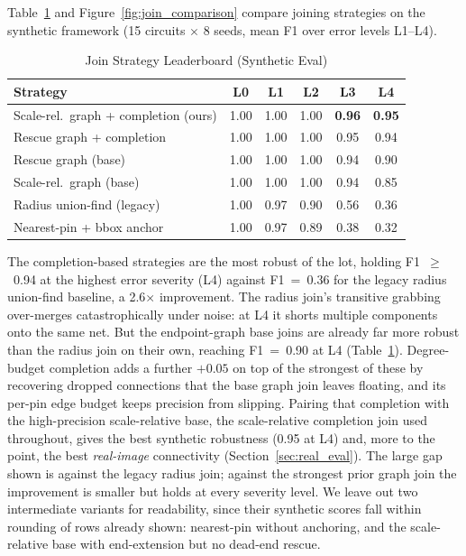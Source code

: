 \documentclass{ieeeaccess}
\begin{document}
Table~\ref{tab:join_leaderboard} and Figure~\ref{fig:join_comparison} compare joining strategies on the synthetic framework (15 circuits $\times$ 8 seeds, mean F1 over error levels L1--L4).

\begin{table}[htbp]
\caption{Join Strategy Leaderboard (Synthetic Eval)}
\label{tab:join_leaderboard}
\begin{center}
\footnotesize
\setlength{\tabcolsep}{4pt}
\begin{tabular}{lccccc}
\toprule
\textbf{Strategy} & \textbf{L0} & \textbf{L1} & \textbf{L2} & \textbf{L3} & \textbf{L4} \\
\midrule
Scale-rel.\ graph + completion (ours) & 1.00 & 1.00 & 1.00 & \textbf{0.96} & \textbf{0.95} \\
Rescue graph + completion & 1.00 & 1.00 & 1.00 & 0.95 & 0.94 \\
Rescue graph (base) & 1.00 & 1.00 & 1.00 & 0.94 & 0.90 \\
Scale-rel.\ graph (base) & 1.00 & 1.00 & 1.00 & 0.94 & 0.85 \\
Radius union-find (legacy) & 1.00 & 0.97 & 0.90 & 0.56 & 0.36 \\
Nearest-pin + bbox anchor & 1.00 & 0.97 & 0.89 & 0.38 & 0.32 \\
\bottomrule
\end{tabular}
\end{center}
\end{table}

The completion-based strategies are the most robust of the lot, holding F1~$\geq$~0.94 at the highest error severity (L4) against F1~=~0.36 for the legacy radius union-find baseline, a 2.6$\times$ improvement. The radius join's transitive grabbing over-merges catastrophically under noise: at L4 it shorts multiple components onto the same net. But the endpoint-graph base joins are already far more robust than the radius join on their own, reaching F1~=~0.90 at L4 (Table~\ref{tab:join_leaderboard}). Degree-budget completion adds a further $+0.05$ on top of the strongest of these by recovering dropped connections that the base graph join leaves floating, and its per-pin edge budget keeps precision from slipping. Pairing that completion with the high-precision scale-relative base, the scale-relative completion join used throughout, gives the best synthetic robustness (0.95 at L4) and, more to the point, the best \emph{real-image} connectivity (Section~\ref{sec:real_eval}). The large gap shown is against the legacy radius join; against the strongest prior graph join the improvement is smaller but holds at every severity level. We leave out two intermediate variants for readability, since their synthetic scores fall within rounding of rows already shown: nearest-pin without anchoring, and the scale-relative base with end-extension but no dead-end rescue.
\end{document}
